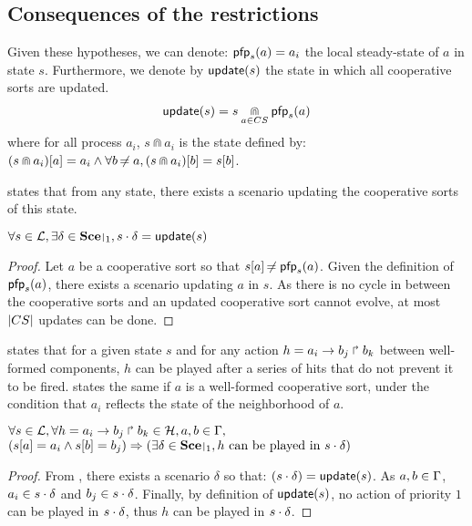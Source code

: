 \subsection{Consequences of the restrictions}
Given these hypotheses, we can denote: $\mathsf{pfp}_s(a) = a_i$ the local steady-state of $a$ in state $s$.
Furthermore, we denote by $\mathsf{update}(s)$ the state in which all cooperative sorts are updated.
\begin{align*}
  \mathsf{update}(s) = s \underset{a \in CS}{\Cap } \mathsf{pfp}_{s}(a)
\end{align*}
where for all process $a_i$, $s \Cap a_i$ is the state defined by:
${(s \Cap a_i)[a]} = a_i \wedge \forall b \not\nobreak\mkern -2mu = a, {(s \Cap a_i)[b]} = {s[b]}$.

 states that from any state, there exists a scenario updating the cooperative sorts of this state.
\begin{theorem}
\label{th:update}
  $\forall s \in \PHl, \exists \delta \in \restriction{\Sce}{1}, s \PHplay \delta = \update(s)$
\end{theorem}
\begin{proof}
  Let $a$ be a cooperative sort so that ${s[a]} \not\nobreak\mkern -2mu = \mathsf{pfp}_s(a)$.
  Given the definition of $\mathsf{pfp}_s(a)$, there exists a scenario updating $a$ in $s$.
  As there is no cycle in between the cooperative sorts and an updated cooperative sort cannot evolve, at most $|CS|$ updates can be done.
\end{proof}
 states that for a given state $s$ and for any action $h = a_i\rightarrow b_j\Rsh b_k$ between well-formed components, $h$ can be played after a series of hits that do not prevent it to be fired.
 states the same if $a$ is a well-formed cooperative sort, under the condition that $a_i$ reflects the state of the neighborhood of $a$.
\begin{theorem}
\label{th:hcompcomp}
  $\forall s \in \mathcal{L}, \forall h = a_i\rightarrow b_j\Rsh b_k \in \mathcal{H}, a,b \in \Gamma,$\\
  $(\PHget{s}{a} = a_i \wedge \PHget{s}{b} = b_j) \Rightarrow (\exists \delta \in \restriction{\Sce}{1}, \text{$h$ can be played in $s \PHplay \delta$})$
\end{theorem}
\begin{proof}
  From , there exists a scenario $\delta$ so that: $(s \cdot \delta) = \mathsf{update}(s)$.
  As $a,b \in \Gamma$, $a_i \in s \cdot \delta$ and $b_j \in s \cdot \delta$.
  Finally, by definition of $\mathsf{update}(s)$, no action of priority $1$ can be played in $s \cdot \delta$, thus $h$ can be played in $s \cdot \delta$.
\end{proof}
